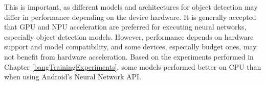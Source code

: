 This is important, as different models and architectures for object detection may differ in performance depending on the device hardware. It is generally accepted that GPU and NPU acceleration are preferred for executing neural networks, especially object detection models. However, performance depends on hardware support and model compatibility, and some devices, especially budget ones, may not benefit from hardware acceleration. Based on the experiments performed in Chapter \ref{bangTrainingExperiments}, some models performed better on CPU than when using Android’s Neural Network API.